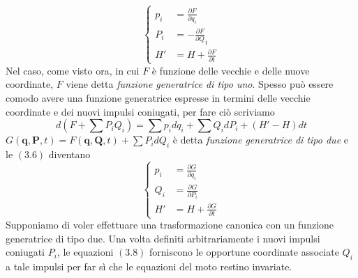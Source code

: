 \documentclass{article}
\begin{document}
\begin{equation}
    \begin{cases}
        p_i &= \frac{\partial F}{\partial q_i} \\
        P_i &= -\frac{\partial F}{\partial Q}_i \\
        H' &= H + \frac{\partial F}{\partial t}
    \end{cases} \tag{3.6}
\end{equation}
Nel caso, come visto ora, in cui $F$ è funzione delle vecchie e delle nuove coordinate, $F$ viene detta \textit{funzione generatrice di tipo uno}. Spesso può essere comodo avere una funzione generatrice espresse in termini delle vecchie coordinate e dei nuovi impulsi coniugati, per fare ciò scriviamo
\begin{equation}
    d\left( F + \sum P_iQ_i \right) = \sum p_idq_i + \sum Q_i dP_i + (H' - H) dt \tag{3.7}
\end{equation}
$G(\mathbf{q}, \mathbf{P}, t) = F(\mathbf{q}, \mathbf{Q}, t) + \sum P_idQ_i$ è detta \textit{funzione generatrice di tipo due} e le $(3.6)$ diventano
\begin{equation}
    \begin{cases}
        p_i &= \frac{\partial G}{\partial q_i} \\
        Q_i &= \frac{\partial G}{\partial P_i} \\
        H' &= H + \frac{\partial G}{\partial t}
    \end{cases} \tag{3.8}
\end{equation}
Supponiamo di voler effettuare una trasformazione canonica con un funzione generatrice di tipo due. Una volta definiti arbitrariamente i nuovi impulsi coniugati $P_i$, le equazioni $(3.8)$ forniscono le opportune coordinate associate $Q_i$ a tale impulsi per far sì che le equazioni del moto restino invariate.

\newpage
\end{document}
